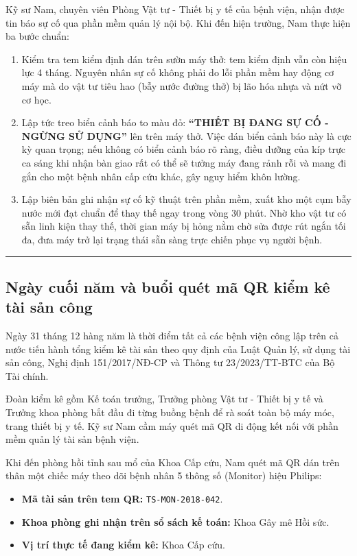 \documentclass[12pt,a4paper]{article}
\begin{document}
Kỹ sư Nam, chuyên viên Phòng Vật tư - Thiết bị y tế của bệnh viện, nhận được tin báo sự cố qua phần mềm quản lý nội bộ. Khi đến hiện trường, Nam thực hiện ba bước chuẩn:
\begin{enumerate}[leftmargin=*]
    \item Kiểm tra tem kiểm định dán trên sườn máy thở: tem kiểm định vẫn còn hiệu lực 4 tháng. Nguyên nhân sự cố không phải do lỗi phần mềm hay động cơ máy mà do vật tư tiêu hao (bẫy nước đường thở) bị lão hóa nhựa và nứt vỡ cơ học.
    \item Lập tức treo biển cảnh báo to màu đỏ: \textbf{``THIẾT BỊ ĐANG SỰ CỐ - NGỪNG SỬ DỤNG''} lên trên máy thở. Việc dán biển cảnh báo này là cực kỳ quan trọng; nếu không có biển cảnh báo rõ ràng, điều dưỡng của kíp trực ca sáng khi nhận bàn giao rất có thể sẽ tưởng máy đang rảnh rỗi và mang đi gắn cho một bệnh nhân cấp cứu khác, gây nguy hiểm khôn lường.
    \item Lập biên bản ghi nhận sự cố kỹ thuật trên phần mềm, xuất kho một cụm bẫy nước mới đạt chuẩn để thay thế ngay trong vòng 30 phút. Nhờ kho vật tư có sẵn linh kiện thay thế, thời gian máy bị hỏng nằm chờ sửa được rút ngắn tối đa, đưa máy trở lại trạng thái sẵn sàng trực chiến phục vụ người bệnh.
\end{enumerate}

\vspace{0.8em}
\noindent\rule{\textwidth}{0.4pt}

\subsection{Ngày cuối năm và buổi quét mã QR kiểm kê tài sản công}

Ngày 31 tháng 12 hàng năm là thời điểm tất cả các bệnh viện công lập trên cả nước tiến hành tổng kiểm kê tài sản theo quy định của Luật Quản lý, sử dụng tài sản công, Nghị định 151/2017/NĐ-CP và Thông tư 23/2023/TT-BTC của Bộ Tài chính.

Đoàn kiểm kê gồm Kế toán trưởng, Trưởng phòng Vật tư - Thiết bị y tế và Trưởng khoa phòng bắt đầu đi từng buồng bệnh để rà soát toàn bộ máy móc, trang thiết bị y tế. Kỹ sư Nam cầm máy quét mã QR di động kết nối với phần mềm quản lý tài sản bệnh viện.

Khi đến phòng hồi tỉnh sau mổ của Khoa Cấp cứu, Nam quét mã QR dán trên thân một chiếc máy theo dõi bệnh nhân 5 thông số (Monitor) hiệu Philips:
\begin{itemize}[leftmargin=*]
    \item \textbf{Mã tài sản trên tem QR:} \texttt{TS-MON-2018-042}.
    \item \textbf{Khoa phòng ghi nhận trên sổ sách kế toán:} Khoa Gây mê Hồi sức.
    \item \textbf{Vị trí thực tế đang kiểm kê:} Khoa Cấp cứu.
\end{itemize}
\end{document}
